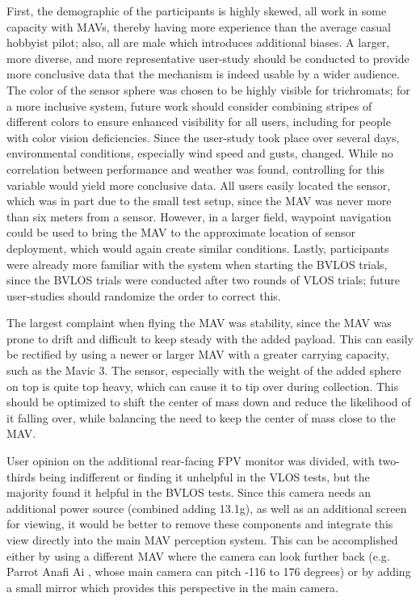 First, the demographic of the participants is highly skewed, all work in some capacity with \glspl{MAV}, thereby having more experience than the average casual hobbyist pilot; also, all are male which introduces additional biases. A larger, more diverse, and more representative user-study should be conducted to provide more conclusive data that the mechanism is indeed usable by a wider audience. The color of the sensor sphere was chosen to be highly visible for trichromats; for a more inclusive system, future work should consider combining stripes of different colors to ensure enhanced visibility for all users, including for people with color vision deficiencies. Since the user-study took place over several days, environmental conditions, especially wind speed and gusts, changed. While no correlation between performance and weather was found, controlling for this variable would yield more conclusive data. All users easily located the sensor, which was in part due to the small test setup, since the \gls{MAV} was never more than six meters from a sensor. However, in a larger field, waypoint navigation could be used to bring the \gls{MAV} to the approximate location of sensor deployment, which would again create similar conditions.  
Lastly, participants were already more familiar with the system when starting the \gls{BVLOS} trials, since the \gls{BVLOS} trials were conducted after two rounds of \gls{VLOS} trials; future user-studies should randomize the order to correct this.

The largest complaint when flying the \gls{MAV} was stability, since the \gls{MAV} was prone to drift and difficult to keep steady with the added payload. This can easily be rectified by using a newer or larger \gls{MAV} with a greater carrying capacity, such as the Mavic 3.
The sensor, especially with the weight of the added sphere on top is quite top heavy, which can cause it to tip over during collection. This should be optimized to shift the center of mass down and reduce the likelihood of it falling over, while balancing the need to keep the center of mass close to the MAV.

User opinion on the additional rear-facing \gls{FPV} monitor was divided, with two-thirds being indifferent or finding it unhelpful in the \gls{VLOS} tests, but the majority found it helpful in the \gls{BVLOS} tests. Since this camera needs an additional power source (combined adding 13.1g), as well as an additional screen for viewing, it would be better to remove these components and integrate this view directly into the main \gls{MAV} perception system. This can be accomplished either by using a different \gls{MAV} where the camera can look further back (e.g. Parrot Anafi Ai \cite{ParrotWhitepaper}, whose main camera can pitch -116 to 176 degrees) or by adding a small mirror which provides this perspective in the main camera.

